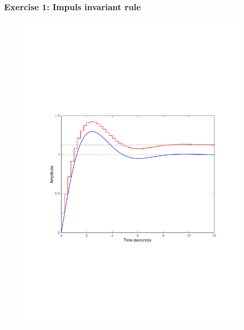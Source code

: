 \begin{frame}
	\frametitle{Exercise 1: Impuls invariant rule}
	\vspace{-0.7em}
	\begin{figure}
		\centering
		\includegraphics[width=0.8\linewidth]{vb3}
	\end{figure}
\end{frame}

